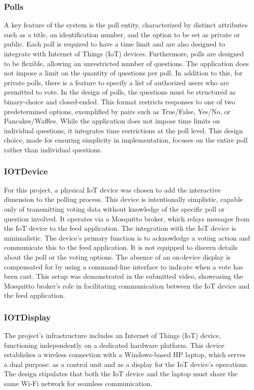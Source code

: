 \subsubsection{Polls}
A key feature of the system is the poll entity, characterized by distinct attributes such as a title, an identification number, and the option to be set as private or public. Each poll is required to have a time limit and are also designed to integrate with Internet of Things (IoT) devices.  Furthermore, polls are designed to be flexible, allowing an unrestricted number of questions. The application does not impose a limit on the quantity of questions per poll.  In addition to this, for private polls, there is a feature to specify a list of authorized users who are permitted to vote. 
In the design of polls, the questions must be structured as binary-choice and closed-ended.  This format restricts responses to one of two predetermined options, exemplified by pairs such as True/False, Yes/No, or Pancakes/Waffles.  While the application does not impose time limits on individual questions, it integrates time restrictions at the poll level.  This design choice, made for ensuring simplicity in implementation, focuses on the entire poll rather than individual questions.

\subsubsection{IOTDevice}
For this project, a physical IoT device was chosen to add the interactive dimension to the polling process.  This device is intentionally simplistic, capable only of transmitting voting data without knowledge of the specific poll or question involved.  It operates via a Mosquitto broker, which relays messages from the IoT device to the feed application. The integration with the IoT device is minimalistic. The device's primary function is to acknowledge a voting action and communicate this to the feed application. It is not equipped to discern details about the poll or the voting options. The absence of an on-device display is compensated for by using a command-line interface to indicate when a vote has been cast. This setup was demonstrated in the submitted video, showcasing the Mosquitto broker's role in facilitating communication between the IoT device and the feed application.

\subsubsection{IOTDisplay}
The project's infrastructure includes an Internet of Things (IoT) device, functioning independently on a dedicated hardware platform. This device establishes a wireless connection with a Windows-based HP laptop, which serves a dual purpose: as a control unit and as a display for the IoT device's operations. The design stipulates that both the IoT device and the laptop must share the same Wi-Fi network for seamless communication.

